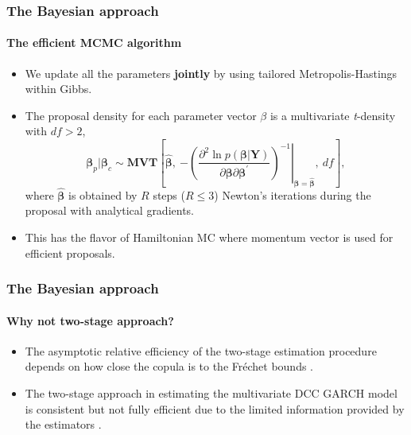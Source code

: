 \documentclass[10pt,aspectratio=43]{beamer}
\begin{document}
\begin{frame}
  \frametitle{The Bayesian approach}
  \framesubtitle{The efficient MCMC algorithm}
  \begin{itemize}

  \item We update all the parameters \textbf{jointly} by using tailored
    Metropolis-Hastings within Gibbs.
  \item The proposal density for each parameter vector $\beta$ is a multivariate \emph{t}-density with  $df>2$,
    \[
    \bm{\beta}_{p} |\bm{\beta}_{c}\sim\bm{MVT}\left[\bm{\hat{\beta}},~\left.-\left(\frac{\partial^{2}\ln
            p(\bm{\beta}|\bm{Y})}{\partial\bm{\beta}\partial\bm{\beta}^{\prime}}\right)^{-1}\right\vert
      _{\bm{\beta}=\bm{\hat{\beta}}},~df\right],
    \]
    where $\bm{\hat{\beta}}$ is obtained by $R$ steps ($R\leq 3$) Newton's
    iterations during the proposal with analytical gradients.

  \item This has the flavor of Hamiltonian MC where momentum vector is used for efficient
    proposals.

  \end{itemize}

\end{frame}


\begin{frame}
  \frametitle{The Bayesian approach}
  \framesubtitle{Why not two-stage approach?}
  \begin{itemize}
  \item The asymptotic relative efficiency of the two-stage estimation procedure depends
    on how close the copula is to the Fr\'echet bounds
    {\citep{joe2005asymptotic}}.
  \item The two-stage approach in estimating the multivariate DCC GARCH model is
    consistent but not fully efficient due to the limited information provided by the
    estimators {\citep{engle2001theoretical}}.
  \end{itemize}
\end{frame}
\end{document}
